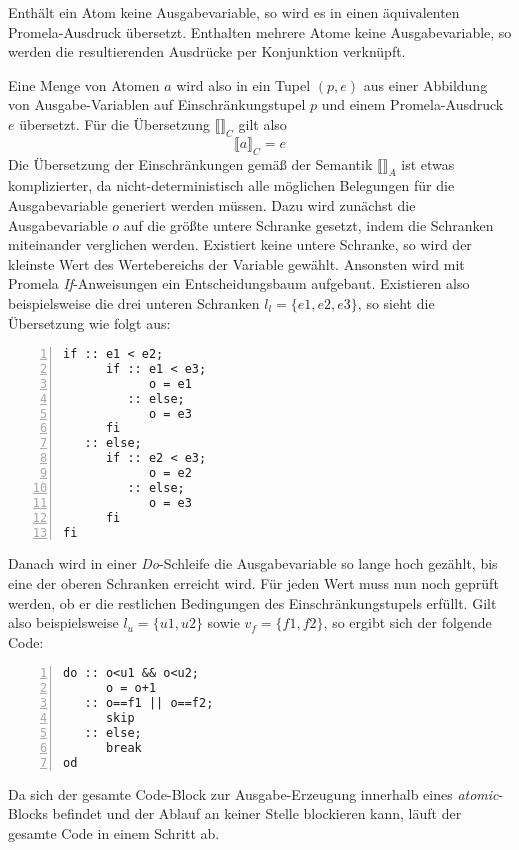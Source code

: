 Enthält ein Atom keine Ausgabevariable, so wird es in einen äquivalenten Promela-Ausdruck übersetzt.
Enthalten mehrere Atome keine Ausgabevariable, so werden die resultierenden Ausdrücke per Konjunktion verknüpft.

Eine Menge von Atomen $a$ wird also in ein Tupel $(p,e)$ aus einer Abbildung von Ausgabe-Variablen auf Einschränkungstupel $p$ und einem Promela-Ausdruck $e$ übersetzt.
Für die Übersetzung $\llbracket \rrbracket_C$ gilt also
\[ \llbracket a\rrbracket_C = e \]
Die Übersetzung der Einschränkungen gemäß der Semantik $\llbracket\rrbracket_A$ ist etwas komplizierter, da nicht-deterministisch alle möglichen Belegungen für die Ausgabevariable generiert werden müssen.
Dazu wird zunächst die Ausgabevariable $o$ auf die größte untere Schranke gesetzt, indem die Schranken miteinander verglichen werden.
Existiert keine untere Schranke, so wird der kleinste Wert des Wertebereichs der Variable gewählt.
Ansonsten wird mit Promela \emph{If}-Anweisungen ein Entscheidungsbaum aufgebaut.
Existieren also beispielsweise die drei unteren Schranken $l_l = \{ e1,e2,e3\}$, so sieht die Übersetzung wie folgt aus:
\begin{lstlisting}[language=promela,numbers=left]
if :: e1 < e2;
      if :: e1 < e3;
            o = e1
         :: else;
            o = e3
      fi
   :: else;
      if :: e2 < e3;
            o = e2
         :: else;
            o = e3
      fi
fi
\end{lstlisting}
Danach wird in einer \emph{Do}-Schleife die Ausgabevariable so lange hoch gezählt, bis eine der oberen Schranken erreicht wird.
Für jeden Wert muss nun noch geprüft werden, ob er die restlichen Bedingungen des Einschränkungstupels erfüllt.
Gilt also beispielsweise $l_u = \{ u1,u2 \}$ sowie $v_f=\{ f1, f2 \}$, so ergibt sich der folgende Code:
\begin{lstlisting}[language=promela,numbers=left,firstnumber=last]
do :: o<u1 && o<u2;
      o = o+1
   :: o==f1 || o==f2;
      skip
   :: else;
      break
od
\end{lstlisting}
Da sich der gesamte Code-Block zur Ausgabe-Erzeugung innerhalb eines \emph{atomic}-Blocks befindet und der Ablauf an keiner Stelle blockieren kann, läuft der gesamte Code in einem Schritt ab.
